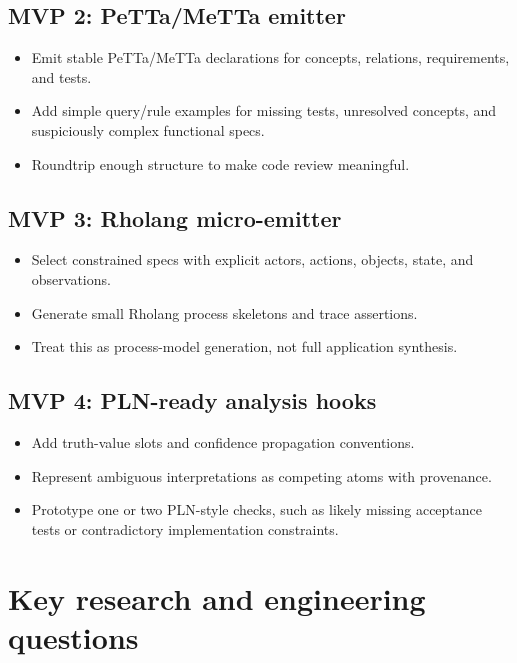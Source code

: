 \documentclass[11pt]{article}
\begin{document}
\subsection*{MVP 2: PeTTa/MeTTa emitter}
\begin{itemize}
  \item Emit stable PeTTa/MeTTa declarations for concepts, relations,
        requirements, and tests.
  \item Add simple query/rule examples for missing tests, unresolved concepts,
        and suspiciously complex functional specs.
  \item Roundtrip enough structure to make code review meaningful.
\end{itemize}

\subsection*{MVP 3: Rholang micro-emitter}
\begin{itemize}
  \item Select constrained specs with explicit actors, actions, objects, state,
        and observations.
  \item Generate small Rholang process skeletons and trace assertions.
  \item Treat this as process-model generation, not full application synthesis.
\end{itemize}

\subsection*{MVP 4: PLN-ready analysis hooks}
\begin{itemize}
  \item Add truth-value slots and confidence propagation conventions.
  \item Represent ambiguous interpretations as competing atoms with provenance.
  \item Prototype one or two PLN-style checks, such as likely missing acceptance
        tests or contradictory implementation constraints.
\end{itemize}

\section{Key research and engineering questions}
\end{document}
